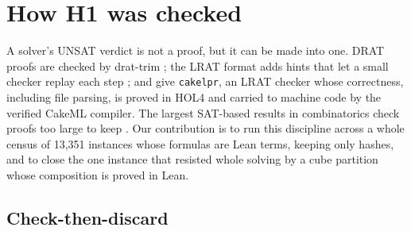 \documentclass{anvil-paper}
\newcommand{\cakelpr}{\texttt{cake\textunderscore lpr}}
\theoremstyle{definition}
\begin{document}
\section{How H1 was checked}\label{sec:h1}

A solver's UNSAT verdict is not a proof, but it can be made into one. DRAT proofs are checked by drat-trim \citep{wetzler2014drat}; the LRAT format adds hints that let a small checker replay each step \citep{cruzfilipe2017lrat}; and \citet{tan2021cakelpr} give \cakelpr{}, an LRAT checker whose correctness, including file parsing, is proved in HOL4 and carried to machine code by the verified CakeML compiler. The largest SAT-based results in combinatorics check proofs too large to keep \citep{heule2016pythagorean,heule2018schur}. Our contribution is to run this discipline across a whole census of 13,351 instances whose formulas are Lean terms, keeping only hashes, and to close the one instance that resisted whole solving by a cube partition \citep{heule2011cube} whose composition is proved in Lean.

\subsection{Check-then-discard}\label{sec:method}
\end{document}

